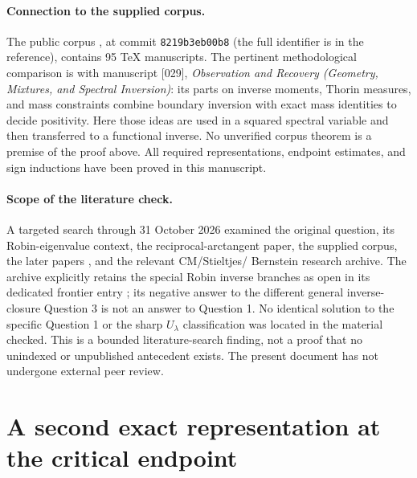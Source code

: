 \documentclass[11pt,a4paper]{article}
\theoremstyle{definition}\newtheorem{definition}[theorem]{Definition}
\theoremstyle{remark}\newtheorem{remark}[theorem]{Remark}
\begin{document}
\paragraph{Connection to the supplied corpus.}
The public corpus \cite{VMRC}, at commit
\texttt{8219b3eb00b8} (the full identifier is in the reference), contains 95
TeX manuscripts. The pertinent methodological comparison is with
manuscript [029], \emph{Observation and Recovery (Geometry,
Mixtures, and Spectral Inversion)}: its parts on inverse moments,
Thorin measures, and mass constraints combine boundary inversion
with exact mass identities to decide positivity. Here those ideas
are used in a squared spectral variable and then transferred to
a functional inverse. No unverified corpus theorem is a premise
of the proof above. All required representations, endpoint
estimates, and sign inductions have been proved in this manuscript.

\paragraph{Scope of the literature check.}
A targeted search through 31 October 2026 examined the original
question, its Robin-eigenvalue context, the reciprocal-arctangent
paper, the supplied corpus, the later papers
\cite{SalazarCM2026,SalazarBF2026}, and the relevant CM/Stieltjes/
Bernstein research archive. The archive explicitly retains the
special Robin inverse branches as open in its dedicated frontier
entry \cite{PudimFrontier}; its negative answer to the different
general inverse-closure Question 3 is not an answer to Question 1.
No identical solution to the specific Question 1 or the sharp
$U_\lambda$ classification was located in the material checked.
This is a bounded literature-search finding, not a proof that no
unindexed or unpublished antecedent exists. The present document
has not undergone external peer review.

\appendix
\section{A second exact representation at the critical endpoint}
\end{document}
